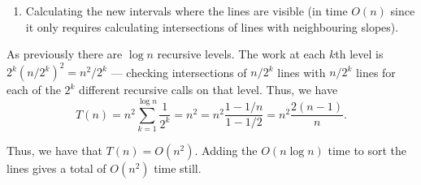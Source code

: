\documentclass[12 pt, letterpaper]{hmcpset}
\begin{document}
\begin{solution}
\begin{enumerate}
\begin{enumerate}[label = \arabic*.]
			\item Calculating the new intervals where the lines are visible (in time $O(n)$ since it only requires calculating intersections of lines with neighbouring slopes).
		\end{enumerate}


		As previously there are $\log n$ recursive levels. The work at each $k$th level is $2^{k} (n / 2^{k})^{2} = n^{2} / 2^{k}$ --- checking intersections of $n / 2^{k}$ lines with $n / 2^{k}$ lines for each of the $2^{k}$ different recursive calls on that level. Thus, we have
		\[
			T(n) = n^{2} \sum_{k = 1}^{\log n} \frac{1}{2^{k}} = n^{2} = n^{2} \frac{1 - 1/n}{1 - 1 / 2} = n^{2} \frac{2 (n - 1)}{n}.
		\]

		Thus, we have that $T(n) = O(n^{2})$. Adding the $O(n \log n)$ time to sort the lines gives a total of $O(n^{2})$ time still.
	\end{enumerate}
\end{solution}
\end{document}
